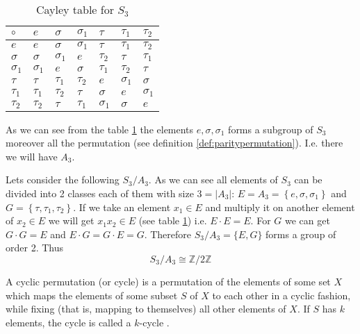 \begin{appendices}
\begin{example}[$S_3$ group]
  \begin{table}
    \centering
    \caption{Cayley table for $S_3$ \cite{wiki:permutationgroups}}
    \label{tab:CayleyS3}
    \begin{tabular}{l|llllll}
      \toprule
      $\circ$ & $e$ & $\sigma$ & $\sigma_1$ & $\tau$ & $\tau_1$ & $\tau_2$\\
      \midrule
      $e$ & $e$ & $\sigma$ & $\sigma_1$ & $\tau$ & $\tau_1$ & $\tau_2$\\
      $\sigma$ & $\sigma$ & $\sigma_1$ & $e$ & $\tau_2$ & $\tau$ & $\tau_1$\\
      $\sigma_1$ & $\sigma_1$ & $e$ & $\sigma$ & $\tau_1$ & $\tau_2$ & $\tau$\\
      $\tau$ & $\tau$ & $\tau_1$ & $\tau_2$ & $e$ & $\sigma_1$ & $\sigma$\\
      $\tau_1$ & $\tau_1$ & $\tau_2$ & $\tau$ & $\sigma$ & $e$ & $\sigma_1$\\
      $\tau_2$ & $\tau_2$ & $\tau$ & $\tau_1$ & $\sigma_1$ & $\sigma$ & $e$\\
      \bottomrule
    \end{tabular}
  \end{table}
  As we can see from the table \ref{tab:CayleyS3} the elements $e,
  \sigma, \sigma_1$ forms a subgroup of $S_3$ moreover all the
  permutation (see definition \ref{def:paritypermutation}). I.e. there
  we will have  $A_3$.
  \label{ex:s3group}
\end{example}

\begin{example}
  Lets consider the following 
  $S_3/A_3$. As we can see all elements of $S_3$ can be divided into 2
  classes each of them with size $3 = \left|A_3\right|$: $E= A_3 =
  \left\{e, \sigma, \sigma_1\right\}$ 
  and $G = \left\{\tau, \tau_1, \tau_2\right\}$. If we take an element
  $x_1 \in E$ and multiply it on another element of $x_2 \in E$ we
  will get $x_1 x_2 \in E$ (see table \ref{tab:CayleyS3}) i.e. $E
  \cdot E =
  E$. For $G$ we can get $G \cdot G = E$ and $E \cdot G = G \cdot E =
  G$. Therefore $S_3/A_3 = \{E, G\}$ forms a group of order 2. Thus
  \[
  S_3/A_3 \cong \mathbb{Z}/2\mathbb{Z}
  \]
  \label{ex:s3a3quotientgroup}
\end{example}

\begin{definition}[Cycle]
  A cyclic permutation (or cycle) is a permutation of the elements of
  some set $X$ which maps the elements of some subset $S$ of $X$ to each
  other in a cyclic fashion, while fixing (that is, mapping to
  themselves) all other elements of $X$. If $S$ has $k$ elements, the cycle
  is called a $k$-cycle \cite{wiki:cyclicpermutation}.
  \label{def:cycle}
\end{definition}


\end{appendices}

